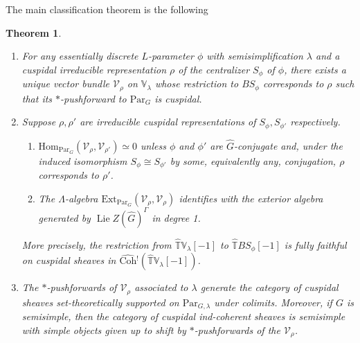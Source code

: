\documentclass{amsart}
\newtheorem{theorem}{Theorem}[subsection]
\theoremstyle{definition}
\theoremstyle{remark}
\numberwithin{equation}{section}
\DeclareMathOperator{\Lie}{Lie}
\newcommand{\mc}{\mathcal}
\newcommand{\Hom}{\mathrm{Hom}}
\newcommand{\wh}{\widehat}
\newcommand{\Par}{\mathrm{Par}}
\newcommand{\Coh}{\mathrm{Coh}}
\newcommand{\V}{\mathbb{V}}
\newcommand{\T}{\mathbb{T}}
\begin{document}
The main classification theorem is the following

\begin{theorem}\label{thm: CVBclassification}
\begin{enumerate}
    \item For any essentially discrete $L$-parameter $\phi$ with semisimplification $\lambda$ and a cuspidal irreducible representation $\rho$ of the centralizer $S_\phi$ of $\phi$, there exists a unique vector bundle $\mc V_\rho$ on $\V_\lambda$ whose restriction to $BS_\phi$ corresponds to $\rho$ such that its $*$-pushforward to $\Par_G$ is cuspidal. 
    \item Suppose $\rho, \rho'$ are irreducible cuspidal representations of $S_{\phi}, S_{\phi'}$ respectively. 
    \begin{enumerate}
    \item $\Hom_{\Par_G} (\mathcal{V}_{\rho}, \mathcal{V}_{\rho'})\simeq 0$ unless $\phi$ and $\phi'$ are $\wh G$-conjugate and, under the induced isomorphism $S_{\phi}\cong S_{\phi'}$ by some, equivalently any, conjugation, $\rho$ corresponds to $\rho'$. 
    \item The $\Lambda$-algebra $\mathrm{Ext}_{\Par_G} (\mc V_{\rho}, \mc{V}_{\rho})$ identifies with the exterior algebra generated by $\Lie Z(\wh G)^\Gamma$ in degree 1. 
    \end{enumerate}
    More precisely, the restriction from $\wh{\T}\V_{\lambda} [-1]$ to $\wh {\T}BS_\phi [-1]$ is fully faithful on cuspidal sheaves in $\wh{\Coh}{}^!(\wh{\T}\V_{\lambda} [-1])$. 
    \item The $\ast$-pushforwards of $\mc{V}_{\rho}$ associated to $\lambda$ generate the category of cuspidal sheaves set-theoretically supported on $\Par_{G, \lambda}$ under colimits. Moreover, if $G$ is semisimple, then the category of cuspidal ind-coherent sheaves is semisimple with simple objects given up to shift by $\ast$-pushforwards of the $\mc V_{\rho}$.
\end{enumerate}
\end{theorem}
\end{document}
